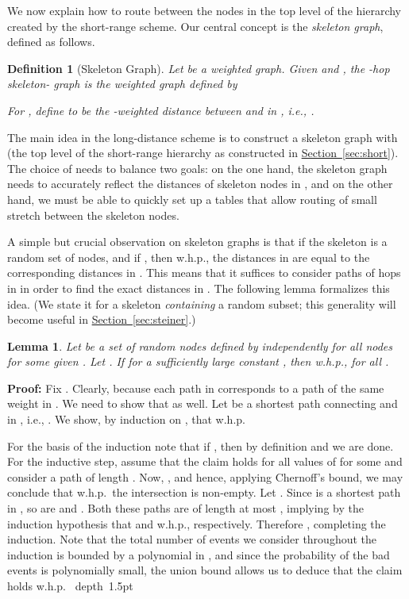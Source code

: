 \documentclass[letterpaper,11pt]{article}
\newcommand{\namedref}[2]{\hyperref[#2]{#1~\ref*{#2}}}
\newcommand{\sectionref}[1]{\namedref{Section}{#1}}
\newtheorem{lemma}[theorem]{Lemma}
\newtheorem{definition}[theorem]{Definition}
\newcommand{\blackslug}{\hbox{\hskip 1pt \vrule width 4pt height 8pt
depth 1.5pt \hskip 1pt}}
\newcommand{\QED}{\quad\blackslug\lower 8.5pt\null\par}
\newenvironment{proof}[1][Proof:]{\noindent \textbf{#1}\xspace}{\QED}
\begin{document}
We now explain how to route between the nodes in the top level of the
hierarchy created by the short-range scheme. Our central
concept is the \emph{skeleton graph},  defined as follows.

\begin{definition}[Skeleton Graph]
Let  be a weighted graph. Given  and , the
\emph{-hop skeleton- graph} is the weighted graph
 defined by
\begin{compactitem}
\item 
\item For , define  to be the
-weighted distance between  and  in , i.e.,
.
\end{compactitem}
\end{definition}

The main idea in the long-distance scheme is to construct a skeleton
graph with  (the top level of the short-range hierarchy as constructed in
\sectionref{sec:short}). The choice of  needs to balance two goals: on the one hand, the skeleton graph needs to accurately reflect the
distances of skeleton nodes in , and on the other hand, we must be able to
quickly set up a tables that allow routing of small stretch between the skeleton
nodes.

A simple but crucial observation on skeleton graphs is that if the skeleton 
is a random set of nodes, and if , then w.h.p., the
distances in  are equal to the corresponding distances in . This
means that it suffices to consider paths of  hops in  in
order to find the exact distances in . The following lemma formalizes this
idea. (We state it for a skeleton \emph{containing} a random subset;
this generality will become useful in \sectionref{sec:steiner}.)

\begin{lemma}\label{lemma:distances}
Let  be a set of random nodes defined
by  independently for all nodes for some given
.
Let .
If   for a sufficiently large
constant , then w.h.p.,  for all .
\end{lemma}
\begin{proof}
Fix . Clearly,  because each
path in  corresponds to a path of the same weight in . We
need to show that  as well. Let
 be a shortest path
connecting  and  in , i.e., .
We show, by induction on , that 
w.h.p.

For the basis of the induction note that if , then by definition
 and we are done. For the inductive step,
assume that the claim holds for all values of  for some 
and consider a path of length . Now, , and hence,
applying Chernoff's bound, we may conclude that w.h.p.\ the intersection is
non-empty. Let . Since  is a shortest path in
, so are  and . Both these paths are of length at
most , implying by the induction hypothesis that 
and  w.h.p., respectively. Therefore
, completing the induction. Note that the total
number of events we consider throughout the induction is bounded by a
polynomial in , and since the probability of the bad events is polynomially
small, the union bound allows us to deduce that the claim holds w.h.p.
\end{proof}
\end{document}
